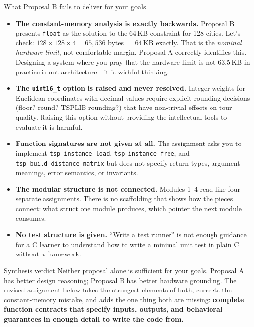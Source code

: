 \begin{critique}{What Proposal B fails to deliver for your goals}
\begin{itemize}
  \item \textbf{The constant-memory analysis is exactly backwards.} Proposal B presents \texttt{float} as the solution to the 64\,KB constraint for 128 cities. Let's check: $128 \times 128 \times 4 = 65{,}536$ bytes $= 64$\,KB exactly. That is the \emph{nominal hardware limit}, not comfortable margin. Proposal A correctly identifies this. Designing a system where you pray that the hardware limit is not 63.5\,KB in practice is not architecture---it is wishful thinking.
  \item \textbf{The \texttt{uint16\_t} option is raised and never resolved.} Integer weights for Euclidean coordinates with decimal values require explicit rounding decisions (floor? round? TSPLIB rounding?) that have non-trivial effects on tour quality. Raising this option without providing the intellectual tools to evaluate it is harmful.
  \item \textbf{Function signatures are not given at all.} The assignment asks you to implement \texttt{tsp\_instance\_load}, \texttt{tsp\_instance\_free}, and \texttt{tsp\_build\_distance\_matrix} but does not specify return types, argument meanings, error semantics, or invariants.
  \item \textbf{The modular structure is not connected.} Modules 1--4 read like four separate assignments. There is no scaffolding that shows how the pieces connect: what struct one module produces, which pointer the next module consumes.
  \item \textbf{No test structure is given.} ``Write a test runner'' is not enough guidance for a C learner to understand how to write a minimal unit test in plain C without a framework.
\end{itemize}
\end{critique}

\begin{inquiry}{Synthesis verdict}
Neither proposal alone is sufficient for your goals. Proposal A has better design reasoning; Proposal B has better hardware grounding. The revised assignment below takes the strongest elements of both, corrects the constant-memory mistake, and adds the one thing both are missing: \textbf{complete function contracts that specify inputs, outputs, and behavioral guarantees in enough detail to write the code from.}
\end{inquiry}

\newpage
